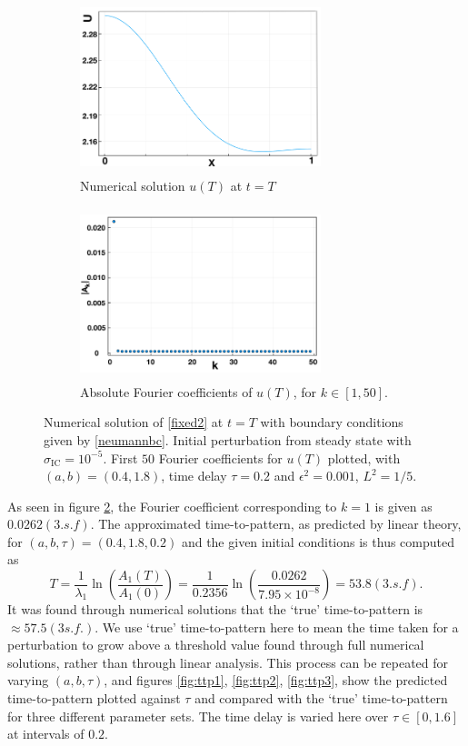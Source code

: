 \begin{figure}[H]
    \centering
    \begin{subfigure}[t]{0.45\textwidth}
        \centering
        \includegraphics[width=7cm,height=5cm]{Tu.png}
        \caption{Numerical solution $u(T)$ at $t=T$}
        \label{uT}
    \end{subfigure}
    \hfill
    \begin{subfigure}[t]{0.45\textwidth}
        \centering
        \includegraphics[width=7cm,height=5cm]{FCs.png}
        \caption{Absolute Fourier coefficients of $u(T)$, for $k\in[1,50]$.}
        \label{fig:uTfc}
    \end{subfigure}
    \caption{Numerical solution of \eqref{fixed2} at $t=T$ with boundary conditions given by \eqref{neumannbc}. Initial perturbation from steady state with $\sigma_{\text{IC}}=10^{-5}$. First $50$ Fourier coefficients for $u(T)$ plotted, with $(a,b)=(0.4,1.8)$, time delay $\tau=0.2$ and $\epsilon^2=0.001$, $L^2=1/5$.}
    \label{fig:Tfc}
\end{figure}
As seen in figure \ref{fig:uTfc}, the Fourier coefficient corresponding to $k=1$ is given as $0.0262(3.s.f)$. The approximated time-to-pattern, as predicted by linear theory, for $(a,b,\tau)=(0.4,1.8,0.2)$ and the given initial conditions is thus computed as
\begin{equation}
    T=\frac{1}{\lambda_1}\ln\left(\frac{A_1(T)}{A_1(0)}\right)=\frac{1}{0.2356}\ln\left(\frac{0.0262}{7.95\times10^{-8}}\right)=53.8(3.s.f).
\end{equation}
It was found through numerical solutions that the `true' time-to-pattern is $\approx57.5(3s.f.)$.
We use `true' time-to-pattern here to mean the time taken for a perturbation to grow above a threshold value found through full numerical solutions, rather than through linear analysis. This process can be repeated for varying $(a,b,\tau)$, and figures \ref{fig:ttp1}, \ref{fig:ttp2}, \ref{fig:ttp3}, show the predicted time-to-pattern plotted against $\tau$ and compared with the `true' time-to-pattern for three different parameter sets. The time delay is varied here over $\tau\in[0,1.6]$ at intervals of $0.2$.

